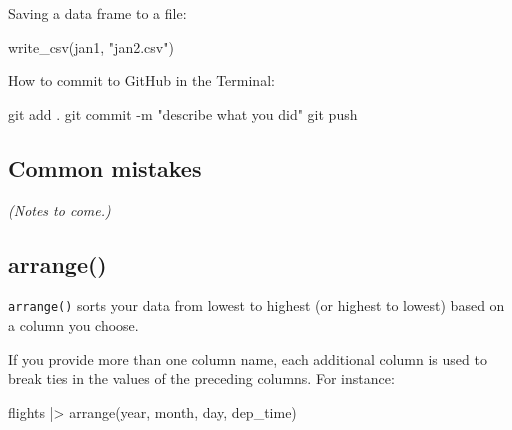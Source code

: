 \documentclass[
  letterpaper,
  DIV=11,
  numbers=noendperiod]{scrreprt}
\newenvironment{Shaded}{\begin{snugshade}}{\end{snugshade}}
\newcommand{\AttributeTok}[1]{\textcolor[rgb]{0.40,0.45,0.13}{#1}}
\newcommand{\FunctionTok}[1]{\textcolor[rgb]{0.28,0.35,0.67}{#1}}
\newcommand{\NormalTok}[1]{\textcolor[rgb]{0.00,0.23,0.31}{#1}}
\newcommand{\SpecialCharTok}[1]{\textcolor[rgb]{0.37,0.37,0.37}{#1}}
\newcommand{\StringTok}[1]{\textcolor[rgb]{0.13,0.47,0.30}{#1}}
\begin{document}
Saving a data frame to a file:

\begin{Shaded}
\begin{Highlighting}[]
\FunctionTok{write\_csv}\NormalTok{(jan1, }\StringTok{"jan2.csv"}\NormalTok{)}
\end{Highlighting}
\end{Shaded}

How to commit to GitHub in the Terminal:

\begin{Shaded}
\begin{Highlighting}[]
\FunctionTok{git}\NormalTok{ add .}
\FunctionTok{git}\NormalTok{ commit }\AttributeTok{{-}m} \StringTok{"describe what you did"}
\FunctionTok{git}\NormalTok{ push}
\end{Highlighting}
\end{Shaded}

\subsection{Common mistakes}\label{common-mistakes}

\emph{(Notes to come.)}

\subsection{arrange()}\label{arrange}

\texttt{arrange()} sorts your data from lowest to highest (or highest to
lowest) based on a column you choose.

If you provide more than one column name, each additional column is used
to break ties in the values of the preceding columns. For instance:

\begin{Shaded}
\begin{Highlighting}[]
\NormalTok{flights }\SpecialCharTok{|\textgreater{}}
  \FunctionTok{arrange}\NormalTok{(year, month, day, dep\_time)}
\end{Highlighting}
\end{Shaded}
\end{document}
